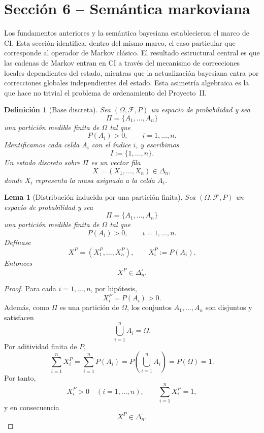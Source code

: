 \documentclass[12pt]{article}
\newtheorem{definicion}{Definición}[section]
\newtheorem{lema}{Lema}[section]
\begin{document}
\section{Sección 6 -- Semántica markoviana}

Los fundamentos anteriores y la semántica bayesiana establecieron el marco de CI. Esta sección identifica, dentro del mismo marco, el caso particular que corresponde al operador de Markov clásico. El resultado estructural central es que las cadenas de Markov entran en CI a través del mecanismo de correcciones locales dependientes del estado, mientras que la actualización bayesiana entra por correcciones globales independientes del estado. Esta asimetría algebraica es la que hace no trivial el problema de ordenamiento del Proyecto~II.

\begin{definicion}[Base discreta]\label{def:base_discreta_markov}
Sea $(\Omega,\mathcal F,P)$ un espacio de probabilidad y sea
\[
\Pi=\{A_1,\dots,A_n\}
\]
una partición medible finita de $\Omega$ tal que
\[
P(A_i)>0,\qquad i=1,\dots,n.
\]
Identificamos cada celda $A_i$ con el índice $i$, y escribimos
\[
I:=\{1,\dots,n\}.
\]
Un estado discreto sobre $\Pi$ es un vector fila
\[
X=(X_1,\dots,X_n)\in\Delta_n,
\]
donde $X_i$ representa la masa asignada a la celda $A_i$.
\end{definicion}

\begin{lema}[Distribución inducida por una partición finita]\label{lem:distribucion_inducida_particion}
Sea $(\Omega,\mathcal F,P)$ un espacio de probabilidad y sea
\[
\Pi=\{A_1,\dots,A_n\}
\]
una partición medible finita de $\Omega$ tal que
\[
P(A_i)>0,\qquad i=1,\dots,n.
\]
Defínase
\[
X^P=(X^P_1,\dots,X^P_n),
\qquad
X^P_i:=P(A_i).
\]
Entonces
\[
X^P\in\Delta_n^\circ.
\]
\end{lema}

\begin{proof}
Para cada $i=1,\dots,n$, por hipótesis,
\[
X^P_i=P(A_i)>0.
\]
Además, como $\Pi$ es una partición de $\Omega$, los conjuntos $A_1,\dots,A_n$ son disjuntos y satisfacen
\[
\bigcup_{i=1}^n A_i=\Omega.
\]
Por aditividad finita de $P$,
\[
\sum_{i=1}^n X^P_i
=
\sum_{i=1}^n P(A_i)
=
P\!\left(\bigcup_{i=1}^n A_i\right)
=
P(\Omega)
=
1.
\]
Por tanto,
\[
X^P_i>0\quad (i=1,\dots,n),
\qquad
\sum_{i=1}^n X^P_i=1,
\]
y en consecuencia
\[
X^P\in\Delta_n^\circ.
\]
\end{proof}
\end{document}
